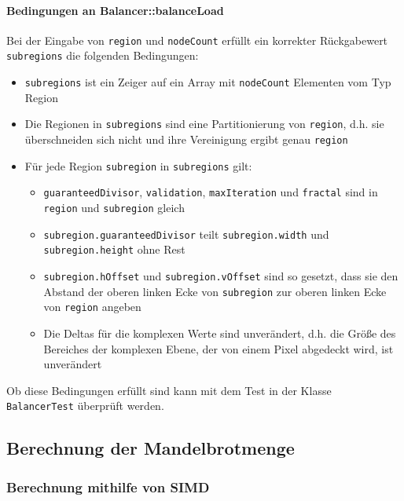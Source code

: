 \paragraph*{Bedingungen an Balancer::balanceLoad}
Bei der Eingabe von \verb|region| und \verb|nodeCount| erfüllt ein korrekter Rückgabewert \verb|subregions| die folgenden Bedingungen:
\begin{itemize}
	\item \verb|subregions| ist ein Zeiger auf ein Array mit \verb|nodeCount| Elementen vom Typ Region
	\item Die Regionen in \verb|subregions| sind eine Partitionierung von \verb|region|, d.h. sie überschneiden sich nicht und ihre Vereinigung ergibt genau \verb|region|
	\item Für jede Region \verb|subregion| in \verb|subregions| gilt:
	\begin{itemize}
		\item \verb|guaranteedDivisor|, \verb|validation|, \verb|maxIteration| und \verb|fractal| sind in \verb|region| und \verb|subregion| gleich
		\item \verb|subregion.guaranteedDivisor| teilt \verb|subregion.width| und \\ \verb|subregion.height| ohne Rest
		\item \verb|subregion.hOffset| und \verb|subregion.vOffset| sind so gesetzt, dass sie den Abstand der oberen linken Ecke von \verb|subregion| zur oberen linken Ecke von \verb|region| angeben
		\item Die Deltas für die komplexen Werte sind unverändert, d.h. die Größe des Bereiches der komplexen Ebene, der von einem Pixel abgedeckt wird, ist unverändert
	\end{itemize}
\end{itemize}

Ob diese Bedingungen erfüllt sind kann mit dem Test in der Klasse \verb|BalancerTest| überprüft werden.

\subsection{Berechnung der Mandelbrotmenge}

\subsubsection{Berechnung mithilfe von SIMD}

